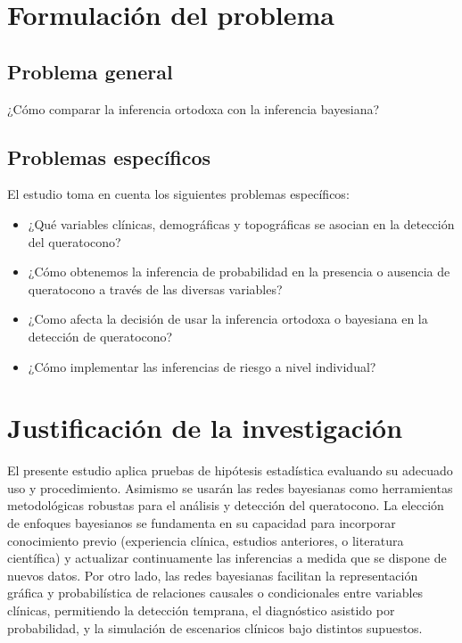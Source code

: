 \section{Formulación del problema}
\subsection{Problema general}
¿Cómo comparar la inferencia ortodoxa con la inferencia bayesiana?

\subsection{Problemas específicos}
El estudio toma en cuenta los siguientes problemas específicos:

\begin{itemize}
	\item ¿Qué variables clínicas, demográficas y topográficas se asocian en la detección del queratocono?
	\item ¿Cómo obtenemos la inferencia de probabilidad en la presencia o ausencia de queratocono a través de las diversas variables?
	\item ¿Como afecta la decisión de usar la inferencia ortodoxa	 o bayesiana en la detección de queratocono?
	\item ¿Cómo implementar las inferencias de riesgo a nivel individual?
\end{itemize}

\section{Justificación de la investigación}
El presente estudio aplica pruebas de hipótesis estadística evaluando su adecuado uso y procedimiento. Asimismo se usarán las redes bayesianas como herramientas metodológicas robustas para el análisis y detección del queratocono. La elección de enfoques bayesianos se fundamenta en su capacidad para incorporar conocimiento previo (experiencia clínica, estudios anteriores, o literatura científica) y actualizar continuamente las inferencias a medida que se dispone de nuevos datos. Por otro lado, las redes bayesianas facilitan la representación gráfica y probabilística de relaciones causales o condicionales entre variables clínicas, permitiendo la detección temprana, el diagnóstico asistido por probabilidad, y la simulación de escenarios clínicos bajo distintos supuestos.

